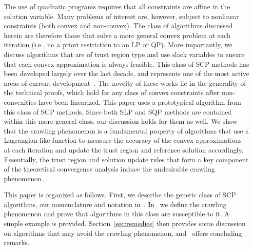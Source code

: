 \documentclass[letterpaper, 10 pt, conference]{ieeeconf}
\begin{document}
The use of quadratic programs requires that all constraints are affine in the solution variable. Many problems of interest are, however, subject to nonlinear constraints (both convex and non-convex). The class of algorithms discussed herein are therefore those that solve a more general convex problem at each iteration (i.e., no a priori restriction to an LP or QP). More importantly, we discuss algorithms that are of trust region type and use slack variables to ensure that each convex approximation is always feasible. This class of SCP methods has been developed largely over the last decade, and represents one of the most active areas of current development~\cite{Mao2016a,Mao2018,Bonalli2019,Bonalli2019b}. The novelty of these works lie in the generality of the technical proofs, which hold for any class of convex constraints after non-convexities have been linearized. This paper uses a prototypical algorithm from this class of SCP methods. Since both SLP and SQP methods are contained within this more general class, our discussion holds for them as well. We show that the crawling phenomenon is a fundamental property of algorithms that use a Lagrangian-like function to measure the accuracy of the convex approximations at each iteration and update the trust region and reference solution accordingly. Essentially, the trust region and solution update rules that form a key component of the theoretical convergence analysis induce the undesirable crawling phenomenon.    


This paper is organized as follows. First, we describe the generic class of SCP algorithms, our nomenclature and notation in~. In~ we define the crawling phenomenon and prove that algorithms in this class are susceptible to it. A simple example is provided. Section~\ref{sec:remedies} then provides some discussion on algorithms that may avoid the crawling phenomenon, and~ offers concluding remarks.
\end{document}

